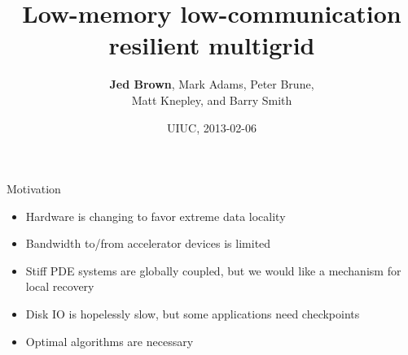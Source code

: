 \documentclass{beamer}
\title{Low-memory low-communication resilient multigrid}
\author{{\bf Jed Brown}\inst{1}, Mark Adams\inst{2}, Peter Brune\inst{1}, \\ Matt Knepley\inst{3}, and Barry Smith\inst{1}}
\institute
{
  \inst{1}{Mathematics and Computer Science Division, Argonne National Laboratory} \\
  \inst{2}{Columbia University} \\
  \inst{3}{University of Chicago}
}
\date{UIUC, 2013-02-06}
\begin{document}
\lstset{language=C}
\normalem

\begin{frame}
  \titlepage
\end{frame}

\begin{frame}{Motivation}
  \begin{itemize}
  \item Hardware is changing to favor extreme data locality
  \item Bandwidth to/from accelerator devices is limited
  \item Stiff PDE systems are globally coupled, but we would like a mechanism for local recovery
  \item Disk IO is hopelessly slow, but some applications need checkpoints
  \item Optimal algorithms are necessary
  \end{itemize}
\end{frame}



\end{document}
